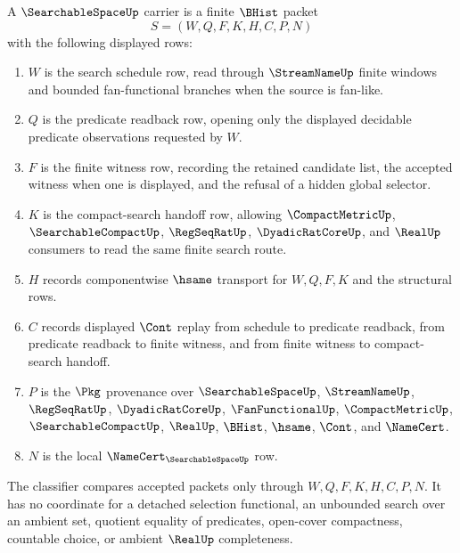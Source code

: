 \begin{definition}
\label{def:searchable-space-carrier}
A $\SearchableSpaceUp$ carrier is a finite $\BHist$ packet
$$
S=(W,Q,F,K,H,C,P,N)
$$
with the following displayed rows:
\begin{enumerate}
\item $W$ is the search schedule row, read through $\StreamNameUp$ finite windows and bounded fan-functional branches when the source is fan-like.
\item $Q$ is the predicate readback row, opening only the displayed decidable predicate observations requested by $W$.
\item $F$ is the finite witness row, recording the retained candidate list, the accepted witness when one is displayed, and the refusal of a hidden global selector.
\item $K$ is the compact-search handoff row, allowing $\CompactMetricUp$, $\SearchableCompactUp$, $\RegSeqRatUp$, $\DyadicRatCoreUp$, and $\RealUp$ consumers to read the same finite search route.
\item $H$ records componentwise $\hsame$ transport for $W,Q,F,K$ and the structural rows.
\item $C$ records displayed $\Cont$ replay from schedule to predicate readback, from predicate readback to finite witness, and from finite witness to compact-search handoff.
\item $P$ is the $\Pkg$ provenance over $\SearchableSpaceUp$, $\StreamNameUp$, $\RegSeqRatUp$, $\DyadicRatCoreUp$, $\FanFunctionalUp$, $\CompactMetricUp$, $\SearchableCompactUp$, $\RealUp$, $\BHist$, $\hsame$, $\Cont$, and $\NameCert$.
\item $N$ is the local $\NameCert_{\SearchableSpaceUp}$ row.
\end{enumerate}
The classifier compares accepted packets only through $W,Q,F,K,H,C,P,N$. It has no coordinate for a detached selection functional, an unbounded search over an ambient set, quotient equality of predicates, open-cover compactness, countable choice, or ambient $\RealUp$ completeness.
\end{definition}

